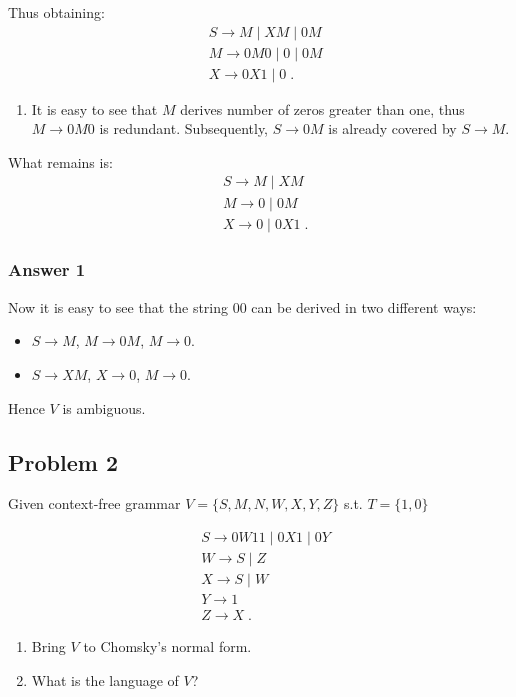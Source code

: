 \documentclass[11pt]{article}
\begin{document}
Thus obtaining:
\begin{align*}
  &S \to M \;|\; XM \;|\; 0M \\
  &M \to 0M0 \;|\; 0 \;|\; 0M \\
  &X \to 0X1 \;|\; 0 \;.
\end{align*}

\begin{enumerate}
\item It is easy to see that $M$ derives number of zeros greater than one,
thus $M \to 0M0$ is redundant.  Subsequently, $S \to 0M$ is already
covered by $S \to M$.
\end{enumerate}


What remains is:
\begin{align*}
  &S \to M \;|\; XM \\
  &M \to 0 \;|\; 0M \\
  &X \to 0 \;|\; 0X1 \;.
\end{align*}

\subsubsection{Answer 1}
\label{sec-1-1-2}
Now it is easy to see that the string 00 can be derived in two different
ways:

\begin{itemize}
\item $S \to M$, $M \to 0M$, $M \to 0$.
\item $S \to XM$, $X \to 0$, $M \to 0$.
\end{itemize}

Hence $V$ is ambiguous.
\subsection{Problem 2}
\label{sec-1-2}
Given context-free grammar $V = \{S,M,N,W,X,Y,Z\}$ s.t. $T=\{1,0\}$

\begin{align*}
  &S \to 0W11 \;|\; 0X1 \;|\; 0Y \\
  &W \to S \;|\; Z \\
  &X \to S \;|\; W \\
  &Y \to 1 \\
  &Z \to X \;.
\end{align*}


\begin{enumerate}
\item Bring $V$ to Chomsky's normal form.
\item What is the language of $V$?
\end{enumerate}
\end{document}
